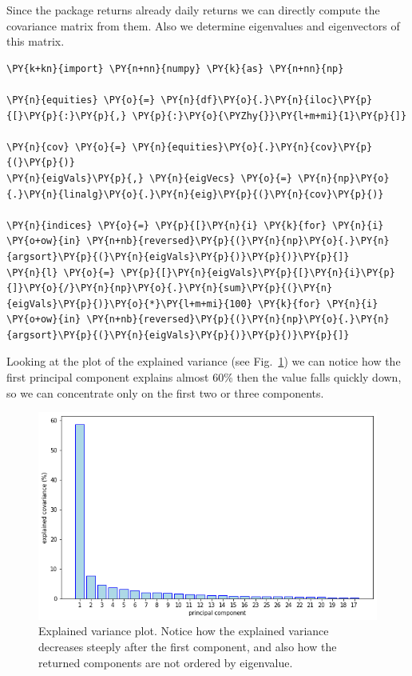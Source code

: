 Since the package returns already daily returns we can directly compute
the covariance matrix from them. Also we determine eigenvalues and
eigenvectors of this matrix.

\begin{codebox}
\begin{Verbatim}[commandchars=\\\{\}]
\PY{k+kn}{import} \PY{n+nn}{numpy} \PY{k}{as} \PY{n+nn}{np}
	
\PY{n}{equities} \PY{o}{=} \PY{n}{df}\PY{o}{.}\PY{n}{iloc}\PY{p}{[}\PY{p}{:}\PY{p}{,} \PY{p}{:}\PY{o}{\PYZhy{}}\PY{l+m+mi}{1}\PY{p}{]}
	
\PY{n}{cov} \PY{o}{=} \PY{n}{equities}\PY{o}{.}\PY{n}{cov}\PY{p}{(}\PY{p}{)}
\PY{n}{eigVals}\PY{p}{,} \PY{n}{eigVecs} \PY{o}{=} \PY{n}{np}\PY{o}{.}\PY{n}{linalg}\PY{o}{.}\PY{n}{eig}\PY{p}{(}\PY{n}{cov}\PY{p}{)}
	
\PY{n}{indices} \PY{o}{=} \PY{p}{[}\PY{n}{i} \PY{k}{for} \PY{n}{i} \PY{o+ow}{in} \PY{n+nb}{reversed}\PY{p}{(}\PY{n}{np}\PY{o}{.}\PY{n}{argsort}\PY{p}{(}\PY{n}{eigVals}\PY{p}{)}\PY{p}{)}\PY{p}{]}
\PY{n}{l} \PY{o}{=} \PY{p}{[}\PY{n}{eigVals}\PY{p}{[}\PY{n}{i}\PY{p}{]}\PY{o}{/}\PY{n}{np}\PY{o}{.}\PY{n}{sum}\PY{p}{(}\PY{n}{eigVals}\PY{p}{)}\PY{o}{*}\PY{l+m+mi}{100} \PY{k}{for} \PY{n}{i} \PY{o+ow}{in} \PY{n+nb}{reversed}\PY{p}{(}\PY{n}{np}\PY{o}{.}\PY{n}{argsort}\PY{p}{(}\PY{n}{eigVals}\PY{p}{)}\PY{p}{)}\PY{p}{]}
\end{Verbatim}
\end{codebox}
	
Looking at the plot of the explained variance (see
Fig.~\ref{fig:explained_variance}) we can notice how the first principal
component explains almost 60\% then the value falls quickly down, so we can concentrate only on the first two or three components.

\begin{figure}[htb]
	\centering
	\includegraphics[width=.7\textwidth]{figures/portfolio_pca_expl_var}
	\caption{Explained variance plot. Notice how the explained variance decreases steeply after the first component, and also how the returned components are not ordered by eigenvalue.}
	\label{fig:explained_variance}
\end{figure}
		
